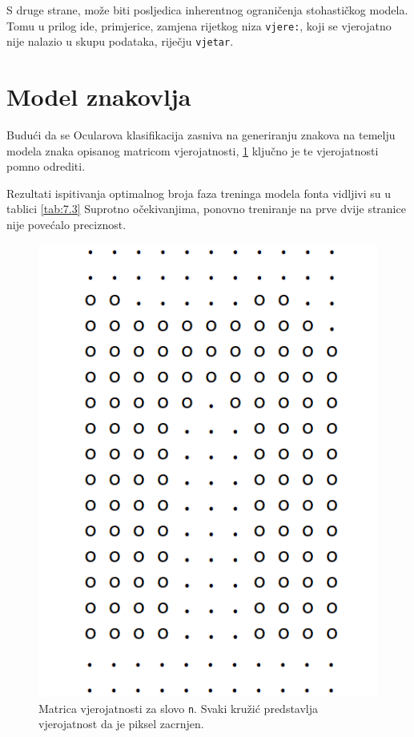 \documentclass[zavrsnirad]{fer}
\begin{document}
S druge strane, može biti posljedica inherentnog ograničenja stohastičkog modela. Tomu u prilog ide, primjerice, zamjena rijetkog niza \texttt{vjere:}, koji se vjerojatno nije nalazio u skupu podataka, riječju \texttt{vjetar}. 

\section{Model znakovlja}

\begin{multicols}{2}
	
Budući da se Ocularova klasifikacija zasniva na generiranju znakova na temelju modela znaka opisanog matricom vjerojatnosti, \ref{slk:matrica} ključno je te vjerojatnosti pomno odrediti.

Rezultati ispitivanja optimalnog broja faza treninga modela fonta vidljivi su u tablici \ref{tab:7.3}  Suprotno očekivanjima, ponovno treniranje na prve dvije stranice nije povećalo preciznost.

	\columnbreak
	
\begin{figure}[H]
	\centering
	\includegraphics[width=0.6\linewidth]{Figures/letter-matrix.png} 
	\caption{Matrica vjerojatnosti za slovo \texttt{n}. Svaki kružić predstavlja vjerojatnost da je piksel zacrnjen.}
	\label{slk:matrica}
\end{figure}

\end{multicols}
\end{document}
